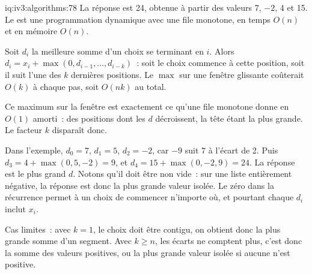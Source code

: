 \begin{solution}{iq:iv3:algorithms:78}
La réponse est 24, obtenue à partir des valeurs 7, $-2$, 4 et 15. Le  est une programmation dynamique avec une file monotone, en temps $O(n)$ et en mémoire $O(n)$.
\label{lst:iv3:al:gapped}

Soit $d_i$ la meilleure somme d'un choix se terminant en $i$. Alors $d_i = x_i + \max(0, d_{i-1}, \dots, d_{i-k})$~: soit le choix commence à cette position, soit il suit l'une des $k$ dernières positions. Le $\max$ sur une fenêtre glissante coûterait $O(k)$ à chaque pas, soit $O(nk)$ au total.

Ce maximum sur la fenêtre est exactement ce qu'une file monotone donne en $O(1)$ amorti~: des positions dont les $d$ décroissent, la tête étant la plus grande. Le facteur $k$ disparaît donc.

Dans l'exemple, $d_0 = 7$, $d_1 = 5$, $d_2 = -2$, car $-9$ suit 7 à l'écart de 2. Puis $d_3 = 4 + \max(0, 5, -2) = 9$, et $d_4 = 15 + \max(0, -2, 9) = 24$. La réponse est le plus grand $d$. Notons qu'il doit être non vide~: sur une liste entièrement négative, la réponse est donc la plus grande valeur isolée. Le zéro dans la récurrence permet à un choix de commencer n'importe où, et pourtant chaque $d_i$ inclut $x_i$.

Cas limites~: avec $k = 1$, le choix doit être contigu, on obtient donc la plus grande somme d'un segment. Avec $k \ge n$, les écarts ne comptent plus, c'est donc la somme des valeurs positives, ou la plus grande valeur isolée si aucune n'est positive.

\end{solution}

